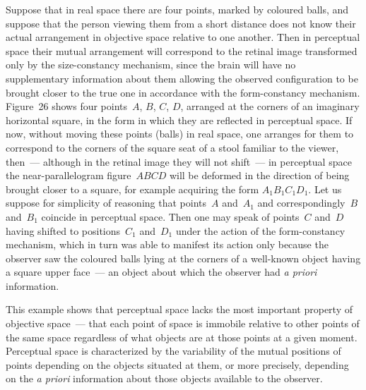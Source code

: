 Suppose that in real space there are four points, marked by coloured balls, and suppose
that the person viewing them from a short distance does not know their actual
arrangement in objective space relative to one another.  Then in perceptual space their
mutual arrangement will correspond to the retinal image transformed only by the
size-constancy mechanism, since the brain will have no supplementary information about
them allowing the observed configuration to be brought closer to the true one in
accordance with the form-constancy mechanism.  Figure~26 shows four points~$A$,
$B$, $C$, $D$, arranged at the corners of an imaginary horizontal square, in the form
in which they are reflected in perceptual space.  If now, without moving these points
(balls) in real space, one arranges for them to correspond to the corners of the square
seat of a stool familiar to the viewer, then~--- although in the retinal image they will not
shift~--- in perceptual space the near-parallelogram figure~$ABCD$ will be deformed
in the direction of being brought closer to a square, for example acquiring the form
$A_1B_1C_1D_1$.  Let us suppose for simplicity of reasoning that points~$A$ and~$A_1$
and correspondingly~$B$ and~$B_1$ coincide in perceptual space.  Then one may speak
of points~$C$ and~$D$ having shifted to positions~$C_1$ and~$D_1$ under the action
of the form-constancy mechanism, which in turn was able to manifest its action only
because the observer saw the coloured balls lying at the corners of a well-known object
having a square upper face~--- an object about which the observer had \emph{a priori}
information.


This example shows that perceptual space lacks the most important property of
objective space~--- that each point of space is immobile relative to other points of the
same space regardless of what objects are at those points at a given moment.  Perceptual
space is characterized by the variability of the mutual positions of points depending on
the objects situated at them, or more precisely, depending on the \emph{a priori}
information about those objects available to the observer.

